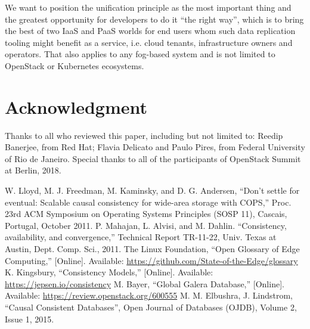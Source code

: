 \documentclass[conference]{IEEEtran}
\begin{document}
We want to position the unification principle as the most important thing and
the greatest opportunity for developers to do it ``the right way'', which is to
bring the best of two IaaS and PaaS worlds for end users whom such data
replication tooling might benefit as a service, i.e. cloud tenants,
infrastructure owners and operators. That also applies to any fog-based system
and is not limited to OpenStack or Kubernetes ecosystems.

\section*{Acknowledgment}

Thanks to all who reviewed this paper, including but not limited to:
Reedip Banerjee, from Red Hat; Flavia Delicato and Paulo Pires, from Federal
University of Rio de Janeiro. Special thanks to all of the participants of
OpenStack Summit at Berlin, 2018.

\begin{thebibliography}{00}
 W. Lloyd, M. J. Freedman, M. Kaminsky, and D. G. Andersen, ``Don’t settle for eventual: Scalable causal consistency for wide-area storage with COPS,'' Proc. 23rd ACM Symposium on Operating Systems Principles (SOSP 11), Cascais, Portugal, October 2011.
 P. Mahajan, L. Alvisi, and M. Dahlin. ``Consistency, availability, and convergence,'' Technical Report TR-11-22, Univ. Texas at Austin, Dept. Comp. Sci., 2011.
 The Linux Foundation, ``Open Glossary of Edge Computing,'' [Online]. Available: \url{https://github.com/State-of-the-Edge/glossary}
 K. Kingsbury, ``Consistency Models,'' [Online]. Available: \url{https://jepsen.io/consistency}
 M. Bayer, ``Global Galera Database,'' [Online]. Available: \url{https://review.openstack.org/600555}
 M. M. Elbushra, J. Lindstrom, ``Causal Consistent Databases'', Open Journal of Databases (OJDB), Volume 2, Issue 1, 2015.
\end{thebibliography}
\end{document}
